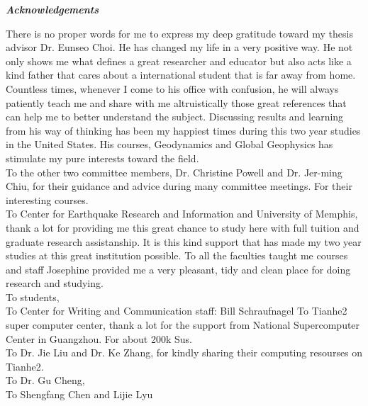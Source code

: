 \begin{center}
\textbf{\textit{Acknowledgements}}
\end{center}

There is no proper words for me to express my deep gratitude toward my thesis advisor Dr. Eunseo Choi. He has changed my life in a very positive way. He not only shows me what defines a great researcher and educator but also acts like a kind father that cares about a international student that is far away from home. Countless times, whenever I come to his office with confusion, he will always patiently teach me and share with me altruistically those great references that can help me to better understand the subject. Discussing results and learning from his way of thinking has been my happiest times during this two year studies in the United States. His courses, Geodynamics and Global Geophysics has stimulate my pure interests toward the field. 
\\
To the other two committee members, Dr. Christine Powell and Dr. Jer-ming Chiu, for their guidance and advice during many committee meetings. For their interesting courses.
\\
To Center for Earthquake Research and Information and University of Memphis, thank a lot for providing me this great chance to study here with full tuition and graduate research assistanship. It is this kind support that has made my two year studies at this great institution possible. To all the faculties taught me courses and staff Josephine provided me a very pleasant, tidy and clean place for doing research and studying. 
\\
To students,
\\
To Center for Writing and Communication staff: Bill Schraufnagel
To Tianhe2 super computer center, thank a lot for the support from National Supercomputer Center in Guangzhou. For about 200k Sus.
\\
To Dr. Jie Liu and Dr. Ke Zhang, for kindly sharing their computing resourses on Tianhe2.
\\
To Dr. Gu Cheng,
\\
To Shengfang Chen and Lijie Lyu 
\\
